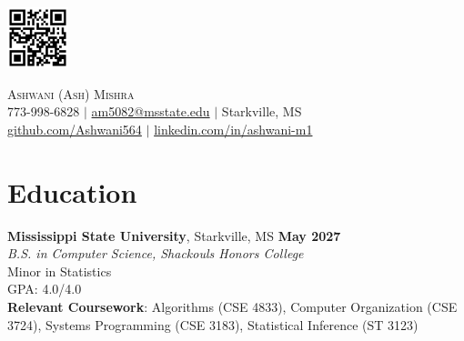\documentclass[letterpaper,10pt]{article} %
\begin{document}

\noindent %
\begin{minipage}[c]{0.7in} %
    \includegraphics[width=0.7in]{qr_code.png}
\end{minipage}
\hfill %
\begin{minipage}[c]{\dimexpr\textwidth-0.8in\relax} %
    \begin{center}
        {\Huge \scshape Ashwani (Ash) Mishra} \\ \vspace{1pt}
        \small 773-998-6828 $|$
        \href{mailto:am5082@msstate.edu}{am5082@msstate.edu} $|$
        Starkville, MS \\
        \href{https://github.com/Ashwani564}{github.com/Ashwani564} $|$
        \href{https://www.linkedin.com/in/ashwani-m1}{linkedin.com/in/ashwani-m1}
    \end{center}
\end{minipage}
\vspace{0.1in} %



\section*{Education}

\textbf{Mississippi State University}, Starkville, MS \hfill \textbf{May 2027} \\
\textit{B.S. in Computer Science, Shackouls Honors College} \\
Minor in Statistics \\
GPA: 4.0/4.0 \\
\textbf{Relevant Coursework}: Algorithms (CSE 4833), Computer Organization (CSE 3724), Systems Programming (CSE 3183), Statistical Inference (ST 3123) %
\end{document}
